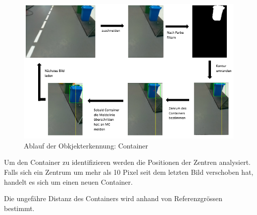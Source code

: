 \begin{figure}[H]%
\centering
\includegraphics[width=1\textwidth]{03_Loesungskonzept/pictures/uebersicht_object.PNG}
\caption{Ablauf der Obkjekterkennung: Container}
\label{fig:objectDetectionOverview}
\end{figure}
Um den Container zu identifizieren werden die Positionen der Zentren analysiert. Falls sich ein Zentrum um mehr als 10 Pixel seit dem letzten Bild verschoben hat, handelt es sich um einen neuen Container.

Die ungefähre Distanz des Containers wird anhand von Referenzgrössen bestimmt.

